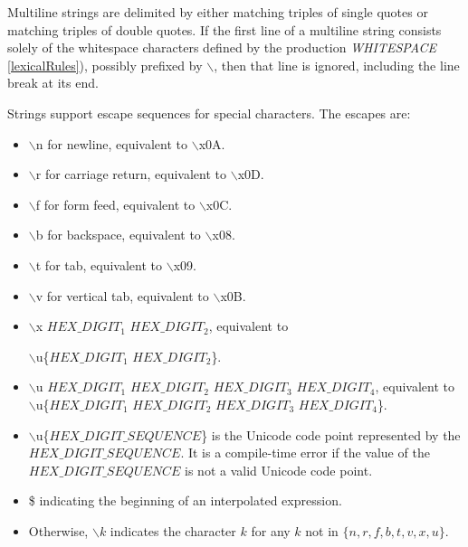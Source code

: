 \documentclass{article}
\begin{document}
\LMHash{}
Multiline strings are delimited by either matching triples of single quotes or matching triples of double quotes.
If the first line of a multiline string consists solely of the whitespace characters defined by the production {\em WHITESPACE} \ref{lexicalRules}), possibly prefixed by $\backslash$, then that line is ignored, including the line break at its end.



\LMHash{}
Strings support escape sequences for special characters.
The escapes are:
\begin{itemize}
\item $\backslash$n for newline, equivalent to $\backslash$x0A.
\item $\backslash$r for carriage return, equivalent to $\backslash$x0D.
\item $\backslash$f for form feed, equivalent to $\backslash$x0C.
\item $\backslash$b for backspace, equivalent to $\backslash$x08.
\item $\backslash$t for tab, equivalent to $\backslash$x09.
\item $\backslash$v for vertical tab, equivalent to $\backslash$x0B.
\item $\backslash$x $HEX\_DIGIT_1$ $HEX\_DIGIT_2$, equivalent to

$\backslash$u\{$HEX\_DIGIT_1$ $HEX\_DIGIT_2$\}.
\item $\backslash$u $HEX\_DIGIT_1$ $HEX\_DIGIT_2$ $HEX\_DIGIT_3$ $HEX\_DIGIT_4$, equivalent to $\backslash$u\{$HEX\_DIGIT_1$ $HEX\_DIGIT_2$ $HEX\_DIGIT_3$ $HEX\_DIGIT_4$\}.
\item $\backslash$u\{$HEX\_DIGIT\_SEQUENCE$\} is the Unicode code point represented by the $HEX\_DIGIT\_SEQUENCE$.
It is a compile-time error if the value of the $HEX\_DIGIT\_SEQUENCE$ is not a valid Unicode code point.
\item \$ indicating the beginning of an interpolated expression.
\item Otherwise, $\backslash k$ indicates the character $k$ for any $k$ not in $\{n, r, f, b, t, v, x, u\}$.
\end{itemize}
\end{document}
